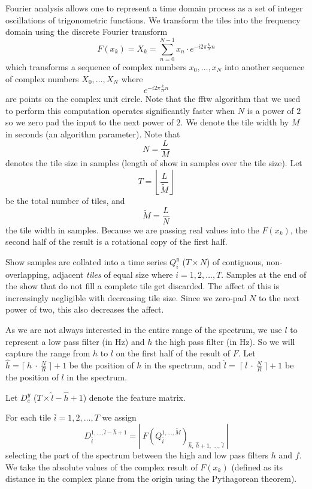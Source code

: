 \documentclass[twocolumn]{article}
\begin{document}
	Fourier analysis allows one to represent a time domain process as a set of integer oscillations of trigonometric functions. We transform the tiles into the frequency domain using the discrete Fourier transform
\[
F(x_k) = X_k = \sum_{n=0}^{N-1} x_n \cdot e^{-i 2 \pi \frac{k}{N} n}
\] which transforms a sequence of complex numbers $x_0,\ldots,x_N$ into another sequence of complex numbers $X_0,\ldots,X_N$ where $$e^{-i 2 \pi \frac{k}{N} n}$$ are points on the complex unit circle. Note that the fftw algorithm \cite{frigo2004fftw} that we used to perform this computation operates significantly faster when $N$ is a power of $2$ so we zero pad the input to the next power of $2$. We denote the tile width by $M$ in seconds (an algorithm parameter). Note that
\[
N = \frac{L}{M}
\] denotes the tile size in samples (length of show in samples over the tile size). Let 
\[
T = \left\lfloor\frac{L}{\tilde{M}}\right\rfloor
\] be the total number of tiles, and \[
\tilde{M}=\frac{L}{N}
\] the tile width in samples.
Because we are passing real values into the $F(x_k)$, the second half of the result is a rotational copy of the first half.
	
	Show samples are collated into a time series $Q_i^y$ ($T \times N$) of contiguous, non-overlapping, adjacent \emph{tiles} of equal size where $i=1,2,\ldots, T$. Samples at the end of the show that do not fill a complete tile get discarded. The affect of this is increasingly negligible with decreasing tile size. Since we zero-pad $N$ to the next power of two, this also decreases the affect.
	
	As we are not always interested in the entire range of the spectrum, we use $l$ to represent a low pass filter (in Hz) and $h$ the high pass filter (in Hz). So we will capture the range from $h$ to $l$ on the first half of the result of $F$. Let $\hat{h} = \lceil~h~\cdot~\frac{{N}}{R} ~\rceil+1$ be the position of $h$ in the spectrum, and $\hat l=~\lceil~l~\cdot~\frac{{N}}{R}~\rceil+1$ be the position of $l$ in the spectrum.
	
	Let $D_e^y$ ($T \times \hat{l}-\hat{h}+1$) denote the feature matrix.
	
	For each tile $\bar{i}=1,2,\ldots,T$ we assign 
\[
D_{\bar{i}}^{1,\ldots,\hat{l}-\hat{h}+1} = \left|~F(Q_{\bar{i}}^{1,\ldots,\tilde{M}})_{\hat{h},~\hat{h}+1,~\ldots,~\hat{l} }~\right|
\]
 selecting the part of the spectrum between the high and low pass filters $h$ and $f$.  We take the absolute values of the complex result of $F(x_k)$ (defined as its distance in the complex plane from the origin using the Pythagorean theorem).
	
\end{document}
